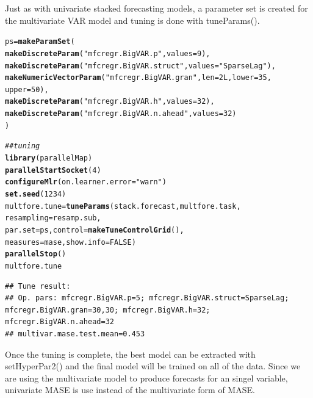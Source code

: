 \documentclass{article}\usepackage[]{graphicx}\usepackage[]{color}
\makeatletter
\newcommand{\hlnum}[1]{\textcolor[rgb]{0.686,0.059,0.569}{#1}}%
\newcommand{\hlstr}[1]{\textcolor[rgb]{0.192,0.494,0.8}{#1}}%
\newcommand{\hlcom}[1]{\textcolor[rgb]{0.678,0.584,0.686}{\textit{#1}}}%
\newcommand{\hlstd}[1]{\textcolor[rgb]{0.345,0.345,0.345}{#1}}%
\newcommand{\hlkwb}[1]{\textcolor[rgb]{0.69,0.353,0.396}{#1}}%
\newcommand{\hlkwc}[1]{\textcolor[rgb]{0.333,0.667,0.333}{#1}}%
\newcommand{\hlkwd}[1]{\textcolor[rgb]{0.737,0.353,0.396}{\textbf{#1}}}%
\newenvironment{kframe}{%
 \def\at@end@of@kframe{}%
 \ifinner\ifhmode%
  \def\at@end@of@kframe{\end{minipage}}%
  \begin{minipage}{\columnwidth}%
 \fi\fi%
 \def\FrameCommand##1{\hskip\@totalleftmargin \hskip-\fboxsep
 \colorbox{shadecolor}{##1}\hskip-\fboxsep
     \hskip-\linewidth \hskip-\@totalleftmargin \hskip\columnwidth}%
 \MakeFramed {\advance\hsize-\width
   \@totalleftmargin\z@ \linewidth\hsize
   \@setminipage}}%
 {\par\unskip\endMakeFramed%
 \at@end@of@kframe}
\newenvironment{knitrout}{}{} %
\theoremstyle{definition}
\newcommand\code{\@codex}
\def\@codex#1{{\normalfont\ttfamily\hyphenchar\font=-1 #1}}
\makeatother
\begin{document}
Just as with univariate stacked forecasting models, a parameter set is created for the multivariate VAR model and tuning is done with \code{tuneParams()}.

\begin{knitrout}
\color{fgcolor}\begin{kframe}
\begin{alltt}
\hlstd{ps} \hlkwb{=} \hlkwd{makeParamSet}\hlstd{(}
  \hlkwd{makeDiscreteParam}\hlstd{(}\hlstr{"mfcregr.BigVAR.p"}\hlstd{,} \hlkwc{values} \hlstd{=} \hlnum{9}\hlstd{),}
  \hlkwd{makeDiscreteParam}\hlstd{(}\hlstr{"mfcregr.BigVAR.struct"}\hlstd{,} \hlkwc{values} \hlstd{=} \hlstr{"SparseLag"}\hlstd{),}
  \hlkwd{makeNumericVectorParam}\hlstd{(}\hlstr{"mfcregr.BigVAR.gran"}\hlstd{,} \hlkwc{len} \hlstd{=} \hlnum{2L}\hlstd{,} \hlkwc{lower} \hlstd{=} \hlnum{35}\hlstd{,}
                         \hlkwc{upper} \hlstd{=} \hlnum{50}\hlstd{),}
  \hlkwd{makeDiscreteParam}\hlstd{(}\hlstr{"mfcregr.BigVAR.h"}\hlstd{,} \hlkwc{values} \hlstd{=} \hlnum{32}\hlstd{),}
  \hlkwd{makeDiscreteParam}\hlstd{(}\hlstr{"mfcregr.BigVAR.n.ahead"}\hlstd{,} \hlkwc{values} \hlstd{=} \hlnum{32}\hlstd{)}
\hlstd{)}

\hlcom{## tuning}
\hlkwd{library}\hlstd{(parallelMap)}
\hlkwd{parallelStartSocket}\hlstd{(}\hlnum{4}\hlstd{)}
\hlkwd{configureMlr}\hlstd{(}\hlkwc{on.learner.error} \hlstd{=} \hlstr{"warn"}\hlstd{)}
\hlkwd{set.seed}\hlstd{(}\hlnum{1234}\hlstd{)}
\hlstd{multfore.tune} \hlkwb{=} \hlkwd{tuneParams}\hlstd{(stack.forecast, multfore.task,}
                           \hlkwc{resampling} \hlstd{= resamp.sub,}
                           \hlkwc{par.set} \hlstd{= ps,} \hlkwc{control} \hlstd{=} \hlkwd{makeTuneControlGrid}\hlstd{(),}
                           \hlkwc{measures} \hlstd{= mase,} \hlkwc{show.info} \hlstd{=} \hlnum{FALSE}\hlstd{)}
\hlkwd{parallelStop}\hlstd{()}
\hlstd{multfore.tune}
\end{alltt}
\end{kframe}
\end{knitrout}

\begin{knitrout}
\color{fgcolor}\begin{kframe}
\begin{verbatim}
## Tune result:
## Op. pars: mfcregr.BigVAR.p=5; mfcregr.BigVAR.struct=SparseLag; mfcregr.BigVAR.gran=30,30; mfcregr.BigVAR.h=32; mfcregr.BigVAR.n.ahead=32
## multivar.mase.test.mean=0.453
\end{verbatim}
\end{kframe}
\end{knitrout}
Once the tuning is complete, the best model can be extracted with \code{setHyperPar2()} and the final model will be trained on all of the data. Since we are using the multivariate model to produce forecasts for an singel variable, univariate MASE is use instead of the multivariate form of MASE.
\end{document}
